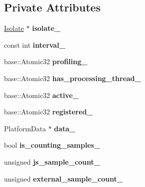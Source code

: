 \subsection*{Private Attributes}
\begin{DoxyCompactItemize}
\item 
\hyperlink{classv8_1_1internal_1_1_isolate}{Isolate} $\ast$ {\bfseries isolate\+\_\+}\hypertarget{classv8_1_1internal_1_1_sampler_adb4fd6ed450100253f4a1ca3f002a858}{}\label{classv8_1_1internal_1_1_sampler_adb4fd6ed450100253f4a1ca3f002a858}

\item 
const int {\bfseries interval\+\_\+}\hypertarget{classv8_1_1internal_1_1_sampler_ab40b39dc52b225681f0f4996d991f361}{}\label{classv8_1_1internal_1_1_sampler_ab40b39dc52b225681f0f4996d991f361}

\item 
base\+::\+Atomic32 {\bfseries profiling\+\_\+}\hypertarget{classv8_1_1internal_1_1_sampler_a8da0d5525b3f623d01d60a26e49f78b2}{}\label{classv8_1_1internal_1_1_sampler_a8da0d5525b3f623d01d60a26e49f78b2}

\item 
base\+::\+Atomic32 {\bfseries has\+\_\+processing\+\_\+thread\+\_\+}\hypertarget{classv8_1_1internal_1_1_sampler_a8acf1a1a7b2da5d4d631dff9e6c35a80}{}\label{classv8_1_1internal_1_1_sampler_a8acf1a1a7b2da5d4d631dff9e6c35a80}

\item 
base\+::\+Atomic32 {\bfseries active\+\_\+}\hypertarget{classv8_1_1internal_1_1_sampler_a2bd58b5336c4bd3a4083d54b4a71eb9d}{}\label{classv8_1_1internal_1_1_sampler_a2bd58b5336c4bd3a4083d54b4a71eb9d}

\item 
base\+::\+Atomic32 {\bfseries registered\+\_\+}\hypertarget{classv8_1_1internal_1_1_sampler_aa4b683ed62b769ab411ac9286b25ef8c}{}\label{classv8_1_1internal_1_1_sampler_aa4b683ed62b769ab411ac9286b25ef8c}

\item 
Platform\+Data $\ast$ {\bfseries data\+\_\+}\hypertarget{classv8_1_1internal_1_1_sampler_a34eb9ef39c4cf49e4b00943add3a0a04}{}\label{classv8_1_1internal_1_1_sampler_a34eb9ef39c4cf49e4b00943add3a0a04}

\item 
bool {\bfseries is\+\_\+counting\+\_\+samples\+\_\+}\hypertarget{classv8_1_1internal_1_1_sampler_aa116985c34e6f7bce8ee611b59052295}{}\label{classv8_1_1internal_1_1_sampler_aa116985c34e6f7bce8ee611b59052295}

\item 
unsigned {\bfseries js\+\_\+sample\+\_\+count\+\_\+}\hypertarget{classv8_1_1internal_1_1_sampler_a85f36aa6a846eaec4cbe21715fdf57f6}{}\label{classv8_1_1internal_1_1_sampler_a85f36aa6a846eaec4cbe21715fdf57f6}

\item 
unsigned {\bfseries external\+\_\+sample\+\_\+count\+\_\+}\hypertarget{classv8_1_1internal_1_1_sampler_a08ac6695557077155ab4461ba4f6f5a9}{}\label{classv8_1_1internal_1_1_sampler_a08ac6695557077155ab4461ba4f6f5a9}

\end{DoxyCompactItemize}


